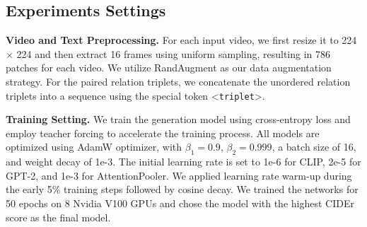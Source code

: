 \documentclass[letterpaper]{article}
\begin{document}
\subsection{Experiments Settings}
\noindent\textbf{Video and Text Preprocessing. } 
For each input video, we first resize it to 224 $\times$ 224 and then extract 16 frames using uniform sampling, resulting in 786 patches for each video. We utilize RandAugment \cite{Ekin2019randaugment} as our data augmentation strategy.
For the paired relation triplets, we concatenate the unordered relation triplets into a sequence using the special token \textless\texttt{triplet}\textgreater.

\noindent\textbf{Training Setting. }
We train the generation model using cross-entropy loss and employ teacher forcing to accelerate the training process.
All models are optimized using AdamW optimizer, with $\beta_{1}=0.9$, $\beta_{2}=0.999$, a batch size of 16, and weight decay of 1e-3.
The initial learning rate is set to 1e-6 for CLIP, 2e-5 for GPT-2, and 1e-3 for AttentionPooler.
We applied learning rate warm-up during the early 5\% training steps followed by cosine decay.
We trained the networks for 50 epochs on 8 Nvidia V100 GPUs and chose the model with the highest CIDEr score as the final model.
\end{document}
